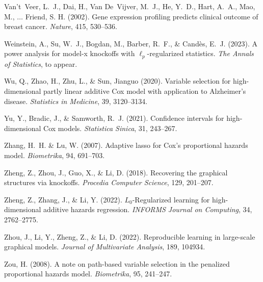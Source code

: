 \documentclass[11pt]{article}
\begin{document}
\begin{thebibliography}{}
	Van't~Veer, L.~J., Dai, H., Van De~Vijver, M.~J., He, Y.~D., Hart, A.~A., Mao,
	M., $\ldots$ Friend, S. H. 
	(2002).
	\newblock Gene expression profiling predicts clinical outcome of breast cancer.
	\newblock \textit{Nature}, 415, 530--536.
	
	Weinstein, A., Su, W.~J., Bogdan, M., Barber, R.~F., \& Cand{\`e}s, E.~J.
	(2023).
	\newblock A power analysis for model-x knockoffs with $\ell_p$-regularized
	statistics.
	\newblock \textit{The Annals of Statistics}, to appear.
	
	
	Wu, Q., Zhao, H., Zhu, L., \& Sun, Jianguo (2020).
	\newblock Variable selection for high-dimensional partly linear additive {Cox} model with application to {Alzheimer's} disease.
	\newblock \textit{Statistics in Medicine}, 39, 3120--3134.	
	
	Yu, Y., Bradic, J., \& Samworth, R.~J. (2021).
	\newblock Confidence intervals for high-dimensional {Cox} models.
	\newblock \textit{Statistica Sinica}, 31, 243--267.
	
	Zhang, H.~H. \& Lu, W. (2007).
	\newblock Adaptive lasso for {Cox's} proportional hazards model.
	\newblock \textit{Biometrika}, 94, 691--703.
	
	Zheng, Z., Zhou, J., Guo, X., \& Li, D. (2018).
	\newblock Recovering the graphical structures via knockoffs.
	\newblock \textit{Procedia Computer Science}, 129, 201--207.
	
	
	Zheng, Z., Zhang, J., \& Li, Y. (2022).
	\newblock ${L}_0$-Regularized learning for high-dimensional additive hazards regression.
	\newblock \textit{INFORMS Journal on Computing}, 34, 2762--2775.
	
	
	Zhou, J., Li, Y., Zheng, Z., \& Li, D. (2022).
	\newblock Reproducible learning in large-scale graphical models.
	\newblock \textit{Journal of Multivariate Analysis}, 189, 104934.
	
	Zou, H. (2008).
	\newblock A note on path-based variable selection in the penalized proportional
	hazards model.
	\newblock \textit{Biometrika}, 95, 241--247.
\end{thebibliography}
\end{document}
